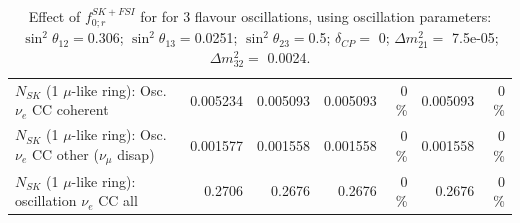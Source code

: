 \begin{table}
\begin{tabular}{| l | r | r | r  r | r  r |}
                          $N_{SK}$ (1 $\mu$-like ring): Osc. $\nu_e$ CC coherent &        0.005234 &        0.005093 &        0.005093 &        0 \%  &        0.005093 &        0 \%  \\ 
           $N_{SK}$ (1 $\mu$-like ring): Osc. $\nu_e$ CC other ($\nu_\mu$ disap) &        0.001577 &        0.001558 &        0.001558 &        0 \%  &        0.001558 &        0 \%  \\ 
                        $N_{SK}$ (1 $\mu$-like ring): oscillation $\nu_e$ CC all &          0.2706 &          0.2676 &          0.2676 &        0 \%  &          0.2676 &        0 \%  \\ 
\hline
\hline
\end{tabular}
\caption{ Effect of $f_{0; r}^{SK+FSI}$ for for 3 flavour oscillations, using oscillation parameters:  $\sin^2\theta_{12} = $0.306; $\sin^2\theta_{13} = $0.0251; $\sin^2\theta_{23} = $0.5; $\delta_{CP} = $        0; $\Delta m^2_{21} = $    7.5e-05; $\Delta m^2_{32} = $    0.0024. }
\label{tab:num_skdetfsi_000_1RmuT_3f_osc_t13:0.0251_spectralreco_spectraltrue}
\end{table}
\clearpage
